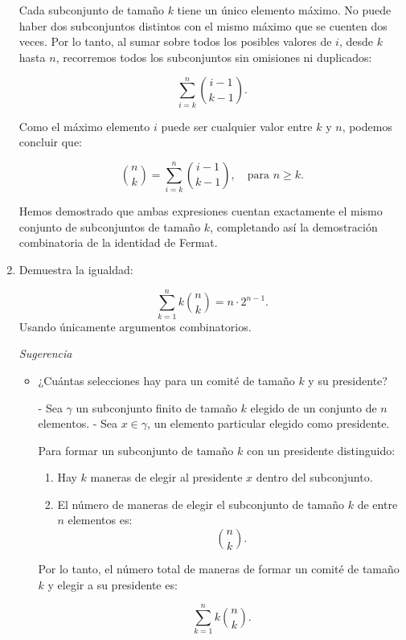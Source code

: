 \documentclass{article}
\begin{document}
\begin{enumerate}
Cada subconjunto de tamaño \(k\) tiene un único elemento máximo. No puede haber dos subconjuntos distintos con el mismo máximo que se cuenten dos veces.  
Por lo tanto, al sumar sobre todos los posibles valores de \(i\), desde \(k\) hasta \(n\), recorremos todos los subconjuntos sin omisiones ni duplicados:

\[
\sum_{i=k}^{n} \binom{i-1}{k-1}.
\]

Como el máximo elemento \(i\) puede ser cualquier valor entre \(k\) y \(n\), podemos concluir que:

\[
\binom{n}{k} = \sum_{i=k}^{n} \binom{i-1}{k-1}, \quad \text{para } n \geq k.
\]
 
Hemos demostrado que ambas expresiones cuentan exactamente el mismo conjunto de subconjuntos de tamaño \(k\), completando así la demostración combinatoria de la identidad de Fermat.


		\item Demuestra la igualdad:

\[
\sum_{k=1}^{n} k \binom{n}{k} = n \cdot 2^{n-1}.
\]
Usando únicamente argumentos combinatorios.

\textit{Sugerencia}

    \begin{itemize}
        \item ¿Cuántas selecciones hay para un comité de tamaño \( k \) y su presidente?

   - Sea \(\gamma\) un subconjunto finito de tamaño \( k \) elegido de un conjunto de \( n \) elementos.
    - Sea \( x \in \gamma \), un elemento particular elegido como presidente.

    Para formar un subconjunto de tamaño \( k \) con un presidente distinguido:

    \begin{enumerate}
        \item Hay \( k \) maneras de elegir al presidente \( x \) dentro del subconjunto.
        \item El número de maneras de elegir el subconjunto de tamaño \( k \) de entre \( n \) elementos es:
        \[
        \binom{n}{k}.
        \]
    \end{enumerate}

    Por lo tanto, el número total de maneras de formar un comité de tamaño \( k \) y elegir a su presidente es:

    \[
    \sum_{k=1}^{n} k \binom{n}{k}.
    \]




\end{itemize}
\end{enumerate}
\end{document}

